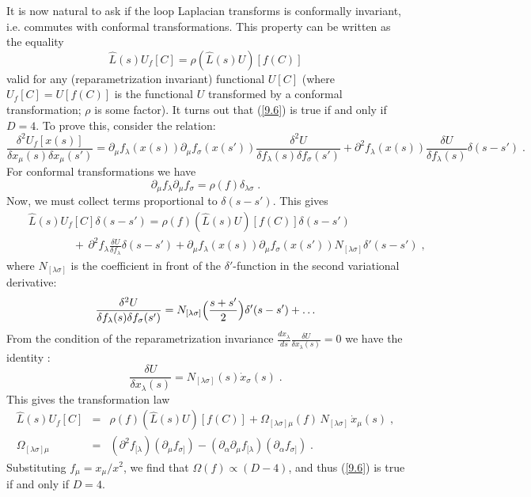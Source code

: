 \documentclass[a4paper,12pt]{article}
\numberwithin{equation}{section}
\begin{document}
It is now natural to ask if the loop Laplacian transforms is conformally invariant,
i.e. commutes with conformal transformations. This property can be written as
the equality
\begin{equation}
\label{9.6}
\widehat{{L}}(s)U_{f}[C]=\rho \left( \widehat{{L}}(s)U\right) [f(C)]
\end{equation}
 valid for any (reparametrization invariant) functional \( U[C] \) (where \( U_{f}[C]=U[f(C)] \)
is the functional \( U \) transformed by a conformal transformation; \( \rho  \)
is some factor). It turns out that (\ref{9.6}) is true if and only if \( D=4 \).
To prove this, consider the relation:
\[
\frac{\delta ^{2}U_{f}[x(s)]}{\delta x_{\mu }(s)\delta x_{\mu }(s')}=\partial _{\mu }f_{\lambda }(x(s))\partial _{\mu }f_{\sigma }(x(s'))\frac{\delta ^{2}U}{\delta f_{\lambda }(s)\delta f_{\sigma }(s')}+\partial ^{2}f_{\lambda }(x(s))\frac{\delta U}{\delta f_{\lambda }(s)}\delta (s-s')\; .\]
 For conformal transformations we have
\[
\partial _{\mu }f_{\lambda }\partial _{\mu }f_{\sigma }=\rho (f)\delta _{\lambda \sigma }\; .\]
 Now, we must collect terms proportional to \( \delta (s-s') \). This gives
\begin{eqnarray*}
 &  & \widehat{{L}}(s)U_{f}[C]\delta (s-s')=\rho (f)\left( \widehat{{L}}(s)U\right) [f(C)]\delta (s-s')\nonumber \\
 &  & \qquad \qquad +\, \partial ^{2}f_{\lambda }\frac{\delta U}{\delta f_{\lambda }}\delta (s-s')+\partial _{\mu }f_{\lambda }(x(s))\partial _{\mu }f_{\sigma }(x(s'))N_{[\lambda \sigma ]}\delta '(s-s')\; ,\label{6.3} 
\end{eqnarray*}
 where \( N_{[\lambda \sigma ]} \) is the coefficient in front of the \( \delta ' \)-function
in the second variational derivative:
\[
\frac{\delta ^{2}U}{\delta f_{\lambda }(s)\delta f_{\sigma }(s')}=N_{[\lambda \sigma ]}\Bigl (\frac{s+s'}{2}\Bigr )\delta '(s-s')+\ldots \]
 From the condition of the reparametrization invariance \( \frac{dx_{\lambda }}{ds}\frac{\delta U}{\delta x_{\lambda }(s)}=0 \)
we have the identity \cite{6}:
\[
\frac{\delta U}{\delta x_{\lambda }(s)}=N_{[\lambda \sigma ]}(s)\dot{x}_{\sigma }(s)\; .\]
 This gives the transformation law
\begin{eqnarray}
\widehat{{L}}(s)U_{f}[C] & = & \rho (f)\left( \widehat{{L}}(s)U\right) [f(C)]+\Omega _{[\lambda \sigma ]\mu }(f)\, N_{[\lambda \sigma ]}\, \dot{x}_{\mu }(s)\; ,\nonumber \\
\Omega _{[\lambda \sigma ]\mu } & = & \left( \partial ^{2}f_{[\lambda }\right) \left( \partial _{\mu }f_{\sigma ]}\right) -\left( \partial _{\alpha }\partial _{\mu }f_{[\lambda }\right) \left( \partial _{\alpha }f_{\sigma ]}\right) \; .\label{9.10} 
\end{eqnarray}
 Substituting \( f_{\mu }=x_{\mu }/x^{2} \), we find that \( \Omega (f)\varpropto (D-4) \),
and thus (\ref{9.6}) is true if and only if \( D=4 \). 
\end{document}
